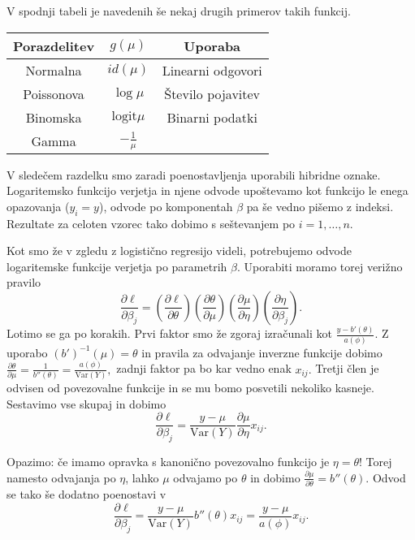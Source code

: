 \documentclass[12pt,a4paper]{amsart}
\theoremstyle{definition} %
\theoremstyle{plain} %
\begin{document}
V spodnji tabeli je navedenih še nekaj drugih primerov takih funkcij.

\begin{center}
    \begin{tabular}{ | c | c | c |}
        \hline
        Porazdelitev & $g(\mu)$ & Uporaba \\
        \hline
        Normalna & $id(\mu)$ &  Linearni odgovori\\
        Poissonova & $\log \mu$ & Število pojavitev \\
        Binomska & $\mathrm{logit}\mu$ & Binarni podatki\\
        Gamma & $-\frac{1}{\mu}$ & \\
        \hline
    \end{tabular}
\end{center}

%
V sledečem razdelku smo zaradi poenostavljenja uporabili hibridne oznake. Logaritemsko funkcijo verjetja in njene odvode upoštevamo kot funkcijo le
enega opazovanja ($y_{i} = y$), odvode po komponentah $\beta$ pa še vedno pišemo z indeksi. Rezultate za celoten vzorec tako dobimo s seštevanjem po $i = 1,\ldots,n.$

Kot smo že v zgledu z logistično regresijo videli, potrebujemo odvode logaritemske funkcije verjetja po parametrih $\beta.$ Uporabiti moramo torej verižno pravilo 
\[
    \frac{\partial \ell}{\partial\beta_{j}} = \left(\frac{\partial \ell}{\partial \theta}\right)\left(\frac{\partial \theta}{\partial\mu}\right)
    \left(\frac{\partial\mu}{\partial\eta}\right)\left(\frac{\partial\eta}{\partial\beta_{j}}\right).
\]
Lotimo se ga po korakih. Prvi faktor smo že zgoraj izračunali kot $\frac{y-b'(\theta)}{a(\phi)}.$ Z uporabo $(b')^{-1}(\mu) = \theta$ in pravila za odvajanje inverzne funkcije 
dobimo $\frac{\partial \theta}{\partial\mu} = \frac{1}{b''(\theta)} = \frac{a(\phi)}{\mathrm{Var}(Y)},$ zadnji faktor pa bo kar vedno enak $x_{ij}.$ Tretji člen je odvisen
od povezovalne funkcije in se mu bomo posvetili nekoliko kasneje. Sestavimo vse skupaj in dobimo
\[
    \frac{\partial \ell}{\partial\beta_{j}} = \frac{y-\mu}{\mathrm{Var}(Y)}\frac{\partial \mu}{\partial\eta}x_{ij}.
\]

Opazimo: če imamo opravka s kanonično povezovalno funkcijo je $\eta = \theta!$ Torej namesto odvajanja po $\eta$, lahko $\mu$ odvajamo po $\theta$ in
dobimo $\frac{\partial\mu}{\partial\theta} = b''(\theta)$. Odvod se tako še dodatno poenostavi v
\begin{equation}
    \frac{\partial \ell}{\partial\beta_{j}} = \frac{y-\mu}{\mathrm{Var}(Y)}b''(\theta)x_{ij} = \frac{y-\mu}{a(\phi)}x_{ij}.
\end{equation}
\end{document}
